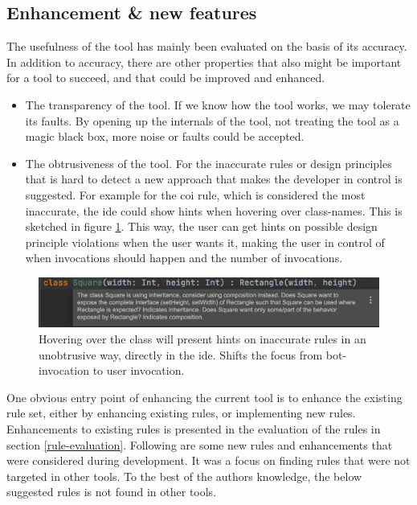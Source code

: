 \documentclass[pdftex,10pt,b5paper,twoside]{report}
\begin{document}
\label{futurework}


\subsection*{Enhancement \& new features}

The usefulness of the tool has mainly been evaluated on the basis of its accuracy. In addition to accuracy, there are other properties that also might be important for a tool to succeed, and that could be improved and enhanced. 

\begin{itemize}
    \item The transparency of the tool. If we know how the tool works, we may tolerate its faults. By opening up the internals of the tool, not treating the tool as a magic black box, more noise or faults could be accepted.
    
    \item The obtrusiveness of the tool. For the inaccurate rules or design principles that is hard to detect a new approach that makes the developer in control is suggested. For example for the \gls{coi} rule, which is considered the most inaccurate, the \gls{ide} could show hints when hovering over class-names. This is sketched in figure \ref{fig:a-new-beginning}. This way, the user can get hints on possible design principle violations when the user wants it, making the user in control of when invocations should happen and the number of invocations.

\end{itemize}


\begin{figure}[h!]
    \centering
    \includegraphics[width=\linewidth]{report/a-new-beginning (2).png}
    \caption{Hovering over the class will present hints on inaccurate rules in an unobtrusive way, directly in the \gls{ide}. Shifts the focus from bot-invocation to user invocation.}
    \label{fig:a-new-beginning}
\end{figure}


One obvious entry point of enhancing the current tool is to enhance the existing rule set, either by enhancing existing rules, or implementing new rules. Enhancements to existing rules is presented in the evaluation of the rules in section \ref{rule-evaluation}. Following are some new rules and enhancements that were considered during development. It was a focus on finding rules that were not targeted in other tools. To the best of the authors knowledge, the below suggested rules is not found in other tools. 
\end{document}
